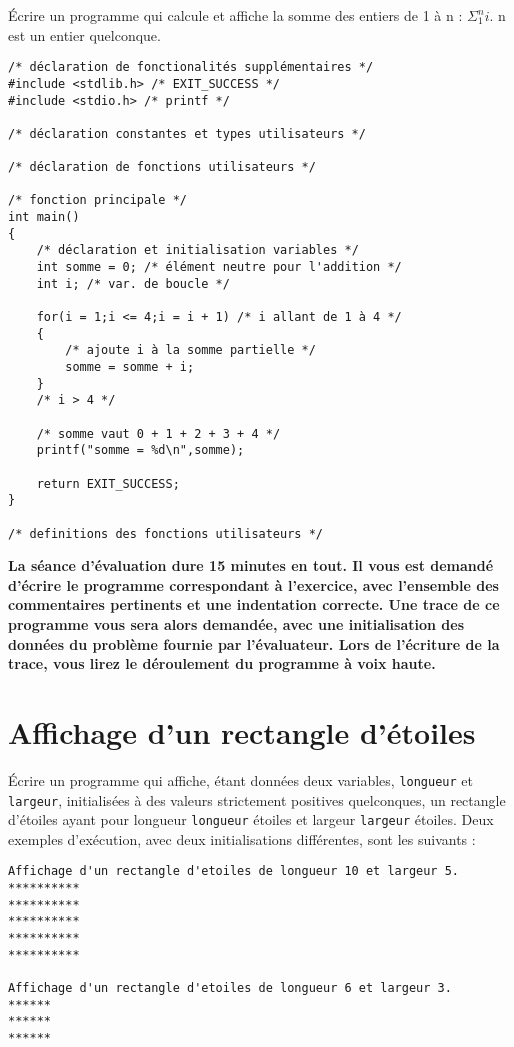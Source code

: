 Écrire un programme qui calcule et affiche la somme des entiers de 1 à
n : $\Sigma_1^n i$. n est un entier quelconque. 

\begin{correction}

\begin{verbatim}
/* déclaration de fonctionalités supplémentaires */
#include <stdlib.h> /* EXIT_SUCCESS */
#include <stdio.h> /* printf */

/* déclaration constantes et types utilisateurs */

/* déclaration de fonctions utilisateurs */

/* fonction principale */
int main()
{
    /* déclaration et initialisation variables */
    int somme = 0; /* élément neutre pour l'addition */
    int i; /* var. de boucle */

    for(i = 1;i <= 4;i = i + 1) /* i allant de 1 à 4 */
    {
        /* ajoute i à la somme partielle */
        somme = somme + i;
    }
    /* i > 4 */

    /* somme vaut 0 + 1 + 2 + 3 + 4 */
    printf("somme = %d\n",somme);

    return EXIT_SUCCESS;
}

/* definitions des fonctions utilisateurs */
\end{verbatim}
\end{correction}

\newpage
\textbf{La séance d'évaluation dure 15 minutes en tout. Il vous est demandé d'écrire le programme correspondant à l'exercice, avec l'ensemble des commentaires pertinents et une indentation correcte. Une trace de ce programme vous sera alors demandée, avec une initialisation des données du problème fournie par l'évaluateur. Lors de l'écriture de la trace, vous lirez le déroulement du programme à voix haute.}

\section{Affichage d'un rectangle d'étoiles}

Écrire un programme qui affiche, étant données deux variables,
\verb|longueur| et \verb|largeur|, initialisées à des valeurs
strictement positives quelconques, un rectangle d'étoiles ayant pour
longueur \verb|longueur| étoiles et largeur \verb|largeur|
étoiles. Deux exemples d'exécution, avec deux initialisations
différentes, sont les suivants :
\begin{verbatim}
Affichage d'un rectangle d'etoiles de longueur 10 et largeur 5.
**********
**********
**********
**********
**********

Affichage d'un rectangle d'etoiles de longueur 6 et largeur 3.
******
******
******
\end{verbatim}

